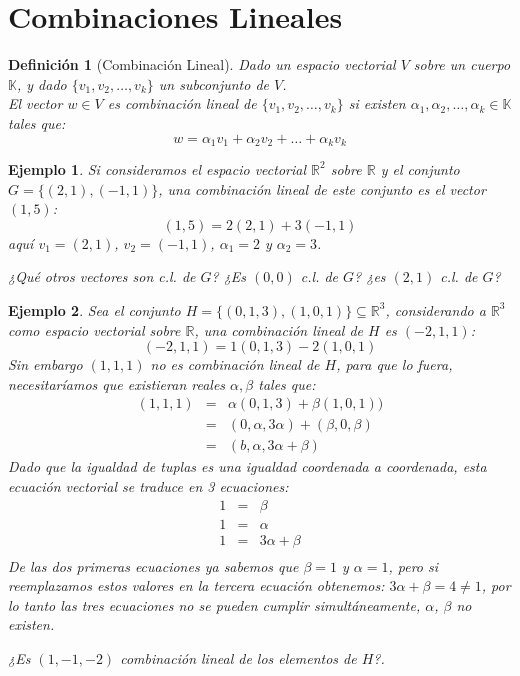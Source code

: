 \documentclass[12pt]{book}
\newtheorem{defi}{Definici\'on}
\newtheorem{ejem}{Ejemplo}
\def\R{\mathbb{R}}
\def\K{\mathbb{K}}
\begin{document}
\section{Combinaciones Lineales}

\begin{defi}[Combinaci\'on Lineal] Dado un espacio vectorial $V$ sobre un cuerpo $\K$, y dado $\{v_1,v_2,\dots,v_k\}$ un subconjunto de $V$. \\
El vector $w\in V$ es {\em combinaci\'on lineal} de $\{v_1,v_2,\dots,v_k\}$ si existen $\alpha_1,\alpha_2,\dots,\alpha_k\in\K$ tales que:
$$w=\alpha_1v_1+\alpha_2v_2+\dots+\alpha_kv_k$$
\end{defi}

\vspace{0.2 cm}

\begin{ejem} {\em Si consideramos el espacio vectorial $\R^2$ sobre $\R$ y el conjunto $G=\{(2,1),(-1,1)\}$, una combinaci\'on lineal de este conjunto es el vector $(1,5)$:
$$(1,5)=2(2,1)+3(-1,1)$$
aqu\'i $v_1=(2,1)$, $v_2=(-1,1)$, $\alpha_1=2$ y $\alpha_2=3$.

¿Qué otros vectores son c.l. de $G$? ¿Es $(0,0)$ c.l. de $G$? ¿es $(2,1)$ c.l. de $G$?
}  
\end{ejem}

\begin{ejem} {\em Sea el conjunto $H=\{(0,1,3),(1,0,1)\}\subseteq \R^3$, considerando a $\R^3$ como espacio vectorial sobre $\R$, una combinación lineal  de $H$ es $(-2,1,1)$:
$$(-2,1,1)=1(0,1,3)-2(1,0,1)$$
Sin embargo $(1,1,1)$ no es combinación lineal de $H$, para que lo fuera, necesitaríamos que existieran reales $\alpha, \beta$ tales que:
\begin{eqnarray*}
(1,1,1)&=&\alpha(0,1,3)+\beta(1,0,1))\\
&=&(0,\alpha,3\alpha)+(\beta,0,\beta)\\
&=&(b,\alpha,3\alpha+\beta)
\end{eqnarray*}
Dado que la igualdad de tuplas es una igualdad coordenada a coordenada, esta ecuación vectorial se traduce en 3 ecuaciones:
\begin{eqnarray}
1&=&\beta\label{eq:uno}\\
1&=&\alpha\label{eq:dos}\\
1&=&3\alpha+\beta\label{eq:tres}\\
\end{eqnarray}
De las dos primeras ecuaciones ya sabemos que $\beta=1$ y $\alpha=1$, pero si reemplazamos estos valores en la tercera ecuación obtenemos: $3\alpha+\beta=4\not=1$, por lo tanto las tres ecuaciones no se pueden cumplir simultáneamente, $\alpha$, $\beta$ no existen.

¿Es $(1,-1,-2)$ combinaci\'on lineal de los elementos de $H$?.
}
\end{ejem}
\end{document}
